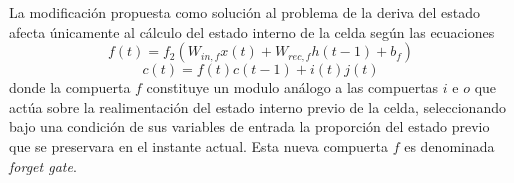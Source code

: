 \documentclass{article}
\begin{document}
	La modificación propuesta como solución al problema de la deriva del estado afecta únicamente al cálculo del estado interno de la celda según las ecuaciones
	\begin{equation*}
	f(t) = f_2(W_{in, f} x(t) + W_{rec, f} h(t-1) + b_f)
	\end{equation*}
	\begin{equation*}
	c(t) = f(t)c(t-1) + i(t)j(t)
	\end{equation*}
	donde la compuerta $f$ constituye un modulo análogo a las compuertas $i$ e $o$ que actúa sobre la realimentación del estado interno previo de la celda, seleccionando bajo una condición de sus variables de entrada la proporción del estado previo que se preservara en el instante actual. Esta nueva compuerta $f$ es denominada \textit{forget gate}.\\
	
\end{document}
